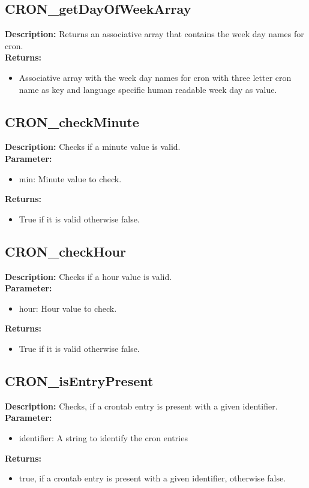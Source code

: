 \subsection{CRON\_getDayOfWeekArray}
\textbf{Description:} Returns an associative array that contains the week day names for cron.\\
\textbf{Returns:}
\begin{itemize}
\item Associative array with the week day names for cron with three letter cron name as key and language specific human readable week day as value.
\end{itemize}

\subsection{CRON\_checkMinute}
\textbf{Description:} Checks if a minute value is valid.\\
\textbf{Parameter:}
\begin{itemize}
\item min: Minute value to check.
\end{itemize}
\textbf{Returns:}
\begin{itemize}
\item True if it is valid otherwise false.
\end{itemize}

\subsection{CRON\_checkHour}
\textbf{Description:} Checks if a hour value is valid.\\
\textbf{Parameter:}
\begin{itemize}
\item hour: Hour value to check.
\end{itemize}
\textbf{Returns:}
\begin{itemize}
\item True if it is valid otherwise false.
\end{itemize}

\subsection{CRON\_isEntryPresent}
\textbf{Description:} Checks, if a crontab entry is present with a given identifier.\\
\textbf{Parameter:}
\begin{itemize}
\item identifier: A string to identify the cron entries
\end{itemize}
\textbf{Returns:}
\begin{itemize}
\item true, if a crontab entry is present with a given identifier, otherwise false.
\end{itemize}

